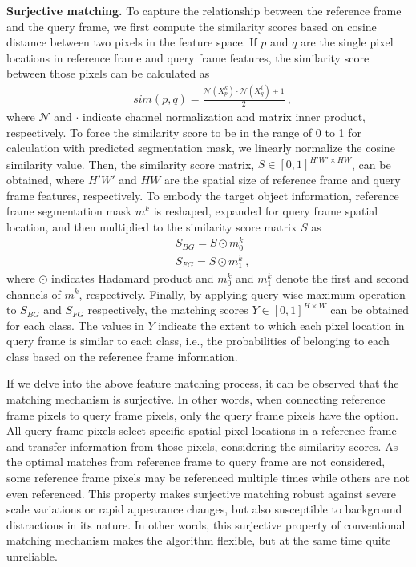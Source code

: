 \documentclass[10pt,twocolumn,letterpaper]{article}
\begin{document}
	\vspace{1mm}
	\noindent\textbf{Surjective matching.} To capture the relationship between the reference frame and the query frame, we first compute the similarity scores based on cosine distance between two pixels in the feature space. If $p$ and $q$ are the single pixel locations in reference frame and query frame features, the similarity score between those pixels can be calculated as
	\begin{align}
	&sim(p, q) = \frac{\mathcal{N}(X^k_p) \cdot \mathcal{N}(X^i_q) + 1} {2}~,
	\label{eq1}
	\end{align}
	where $\mathcal{N}$ and $\cdot$ indicate channel normalization and matrix inner product, respectively. To force the similarity score to be in the range of 0 to 1 for calculation with predicted segmentation mask, we linearly normalize the cosine similarity value. Then, the similarity score matrix, $S \in [0,1]^{H'W' \times HW}$, can be obtained, where $H'W'$ and $HW$ are the spatial size of reference frame and query frame features, respectively. To embody the target object information, reference frame segmentation mask $m^k$ is reshaped, expanded for query frame spatial location, and then multiplied to the similarity score matrix $S$ as
	\begin{align}
	&S_{BG} = S \odot m^k_0\nonumber\\
	&S_{FG} = S \odot m^k_1~,
	\label{eq2}
	\end{align}
	where $\odot$ indicates Hadamard product and $m^k_0$ and $m^k_1$ denote the first and second channels of $m^k$, respectively. Finally, by applying query-wise maximum operation to $S_{BG}$ and $S_{FG}$ respectively, the matching scores $Y \in [0,1]^{H \times W}$ can be obtained for each class. The values in $Y$ indicate the extent to which each pixel location in query frame is similar to each class, i.e., the probabilities of belonging to each class based on the reference frame information. 
	
	
	If we delve into the above feature matching process, it can be observed that the matching mechanism is surjective. In other words, when connecting reference frame pixels to query frame pixels, only the query frame pixels have the option. All query frame pixels select specific spatial pixel locations in a reference frame and transfer information from those pixels, considering the similarity scores. As the optimal matches from reference frame to query frame are not considered, some reference frame pixels may be referenced multiple times while others are not even referenced. This property makes surjective matching robust against severe scale variations or rapid appearance changes, but also susceptible to background distractions in its nature. In other words, this surjective property of conventional matching mechanism makes the algorithm flexible, but at the same time quite unreliable.
	
\end{document}
